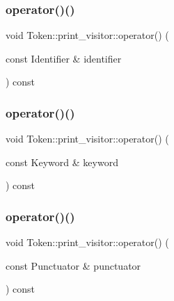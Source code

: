 \subsubsection{\texorpdfstring{operator()()}{operator()()}\hspace{0.1cm}{\footnotesize\ttfamily [2/9]}}
{\footnotesize\ttfamily void Token\+::print\+\_\+visitor\+::operator() (\begin{DoxyParamCaption}\item[{const Identifier \&}]{identifier }\end{DoxyParamCaption}) const\hspace{0.3cm}{\ttfamily [inline]}}

\mbox{\label{struct_token_1_1print__visitor_a36d0662b3d8a3ae257a318d71a96e5ba}} 
\subsubsection{\texorpdfstring{operator()()}{operator()()}\hspace{0.1cm}{\footnotesize\ttfamily [3/9]}}
{\footnotesize\ttfamily void Token\+::print\+\_\+visitor\+::operator() (\begin{DoxyParamCaption}\item[{const Keyword \&}]{keyword }\end{DoxyParamCaption}) const\hspace{0.3cm}{\ttfamily [inline]}}

\mbox{\label{struct_token_1_1print__visitor_af16c79081b866ab87dda15bbc1a49edf}} 
\subsubsection{\texorpdfstring{operator()()}{operator()()}\hspace{0.1cm}{\footnotesize\ttfamily [4/9]}}
{\footnotesize\ttfamily void Token\+::print\+\_\+visitor\+::operator() (\begin{DoxyParamCaption}\item[{const Punctuator \&}]{punctuator }\end{DoxyParamCaption}) const\hspace{0.3cm}{\ttfamily [inline]}}

